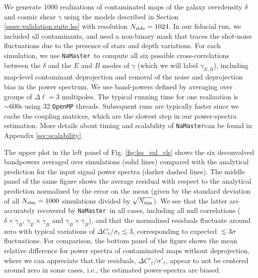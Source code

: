 \documentclass[usenatbib]{mnrasb}
\newcommand{\nmt}{{\tt NaMaster}}
\begin{document}
      We generate 1000 realizations of contaminated maps of the galaxy overdensity $\delta$ and cosmic shear $\gamma$ using the models described in Section \ref{sssec:validation.suite.lss} with resolution $N_{\rm side}=1024$. In our fiducial run, we included all contaminants, and used a non-binary mask that traces the shot-noise fluctuations due to the presence of stars and depth variations. For each simulation, we use \nmt~to compute all six possible cross-correlations between the $\delta$ and the $E$ and $B$ modes of $\gamma$ (which we will label $\gamma_{E,B}$), including map-level contaminant deprojection and removal of the noise and deprojection bias in the power spectrum. We use band-powers defined by averaging over groups of $\Delta\ell=3$ multipoles. The typical running time for one realization is $\sim 600$s using 32 \texttt{OpenMP} threads. Subsequent runs are typically faster since we cache the coupling matrices, which are the slowest step in our power-spectra estimation. More details about timing and scalability of \nmt can be found in Appendix \ref{sec:scalability}.
      
      The upper plot in the left panel of Fig. \ref{fig:lss_val_cls} shows the six deconvolved bandpowers averaged over simulations (solid lines) compared with the analytical prediction for the input signal power spectra (darker dashed lines). The middle panel of the same figure shows the average residual with respect to the analytical prediction normalized by the error on the mean (given by the standard deviation of all $N_{\rm sim}=1000$ simulations divided by $\sqrt{N_{\rm sim}}$). We see that the latter are accurately recovered by \nmt~in all cases, including all null correlations ($\delta\times\gamma_B$, $\gamma_E\times\gamma_B$ and $\gamma_B\times\gamma_B$), and that the normalized residuals fluctuate around zero with typical variations of $\Delta C_\ell/\sigma_\ell\lesssim3$, corresponding to expected $\lesssim3\sigma$ fluctuations. For comparison, the bottom panel of the figure shows the mean relative difference for power spectra of contaminated maps without deprojection, where we can appreciate that the residuals, $\Delta C'_{\ell}/\sigma'_{\ell}$, appear to not be centered around zero in some cases, i.e., the estimated power-spectra are biased.
      
\end{document}
